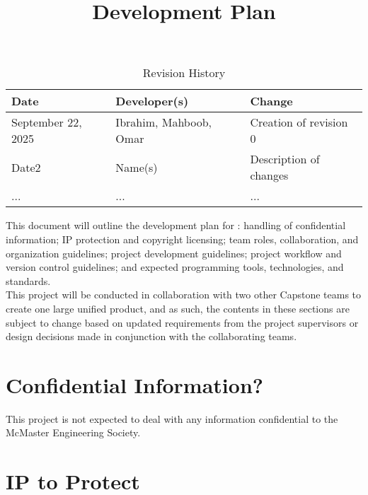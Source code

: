 \documentclass{article}
\title{Development Plan\\\progname}
\author{\authname}
\date{}
\begin{document}
\maketitle
\begin{table}[hp]
\caption{Revision History} \label{TblRevisionHistory}
\begin{tabularx}{\textwidth}{llX}
\toprule
\textbf{Date} & \textbf{Developer(s)} & \textbf{Change}\\
\midrule
September 22, 2025 & Ibrahim, Mahboob, Omar & Creation of revision 0\\
Date2 & Name(s) & Description of changes\\
... & ... & ...\\
\bottomrule
\end{tabularx}
\end{table}

\newpage{}

This document will outline the development plan for \textbf{\teamname}:
handling of confidential information; IP protection and copyright licensing;
team roles, collaboration, and organization guidelines; project development
guidelines; project workflow and version control guidelines; and expected
programming tools, technologies, and standards.\\

This project will be conducted in collaboration with two other Capstone teams
to create one large unified product, and as such, the contents in these
sections are subject to change based on updated requirements from the project
supervisors or design decisions made in conjunction with the collaborating
teams.

\begin{comment}
\wss{Additional information on the development plan can be found in the
\href{https://gitlab.cas.mcmaster.ca/courses/capstone/-/blob/main/Lectures/L02b_POCAndDevPlan/POCAndDevPlan.pdf?ref_type=heads}
{lecture slides}.}
\end{comment}

\section{Confidential Information?}
\begin{flushleft}
This project is not expected to deal with any information confidential to the McMaster Engineering Society. 
\end{flushleft}

\section{IP to Protect}
\end{document}
